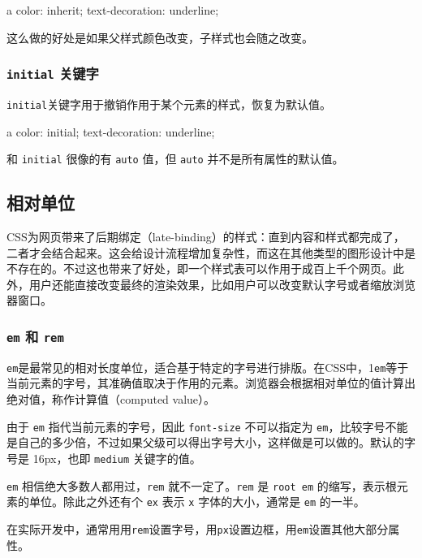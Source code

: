 \begin{HTML}
a {
    color: inherit;
    text-decoration: underline;
}
\end{HTML}

这么做的好处是如果父样式颜色改变，子样式也会随之改变。

\subsubsection*{\texttt{initial} 关键字}

\texttt{initial}关键字用于撤销作用于某个元素的样式，恢复为默认值。

\begin{HTML}
a {
    color: initial;
    text-decoration: underline;
}
\end{HTML}

和 \texttt{initial} 很像的有 \texttt{auto} 值，但 \texttt{auto} 并不是所有属性的默认值。

\subsection{相对单位}

CSS为网页带来了后期绑定（late-binding）的样式：直到内容和样式都完成了，二者才会结合起来。这会给设计流程增加复杂性，而这在其他类型的图形设计中是不存在的。不过这也带来了好处，即一个样式表可以作用于成百上千个网页。此外，用户还能直接改变最终的渲染效果，比如用户可以改变默认字号或者缩放浏览器窗口。

\subsubsection*{\texttt{em} 和 \texttt{rem}}

\texttt{em}是最常见的相对长度单位，适合基于特定的字号进行排版。在CSS中，1\texttt{em}等于当前元素的字号，其准确值取决于作用的元素。浏览器会根据相对单位的值计算出绝对值，称作计算值（computed value）。

由于 \texttt{em} 指代当前元素的字号，因此 \texttt{font-size} 不可以指定为 \texttt{em}，比较字号不能是自己的多少倍，不过如果父级可以得出字号大小，这样做是可以做的。默认的字号是 16px，也即 \texttt{medium} 关键字的值。

\texttt{em} 相信绝大多数人都用过，\texttt{rem} 就不一定了。\texttt{rem} 是 \texttt{root em} 的缩写，表示根元素的单位。除此之外还有个 \texttt{ex} 表示 \texttt{x} 字体的大小，通常是 \texttt{em} 的一半。

在实际开发中，通常用用\texttt{rem}设置字号，用\texttt{px}设置边框，用\texttt{em}设置其他大部分属性。


